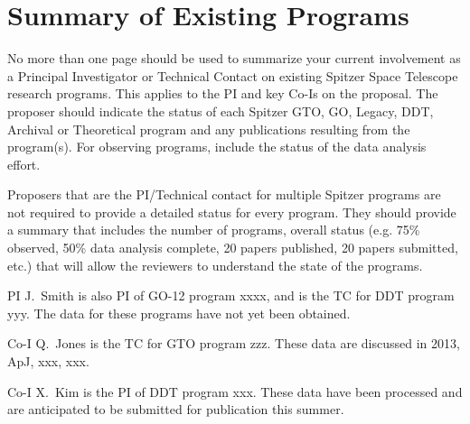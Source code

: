 \documentclass[letterpaper,12pt]{article}
\begin{document}




\section{Summary of Existing Programs}

No more than one page should be used to summarize your current
involvement as a Principal Investigator or Technical Contact on existing 
Spitzer Space Telescope research programs. This applies to the PI and 
key Co-Is on the proposal. The proposer should indicate the status of 
each Spitzer GTO, GO, Legacy, DDT, Archival or Theoretical program and 
any publications resulting from the program(s). For observing programs, 
include the status of the data analysis effort.

Proposers that are the PI/Technical contact for multiple Spitzer programs 
are not required to provide a detailed status for every program. They 
should provide a summary that includes the number of programs, overall 
status (e.g. 75\% observed, 50\% data analysis complete, 20 papers published, 
20 papers submitted, etc.) that will allow the reviewers to understand 
the state of the programs.\newline


PI J.\ Smith is also PI of GO-12 program xxxx, and is the TC for
DDT program yyy.  The data for these programs have not yet been
obtained.

Co-I Q.\ Jones is the TC for GTO program zzz.  These data are
discussed in 2013, ApJ, xxx, xxx.

Co-I X.\ Kim is the PI of DDT program xxx.  These data have been
processed and are anticipated to be submitted for publication
this summer.\newline
\end{document}
